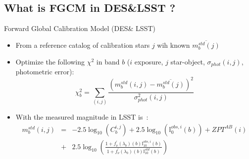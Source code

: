 \documentclass{beamer}
\begin{document}
\subsection{What is FGCM  in DES\&LSST ?}
\begin{frame}{Forward Global Calibration Model {\small (DES\& LSST)}}
\begin{itemize}
\item From a reference catalog of calibration stars $j$ wih known $\overline{m_b^{std}(j)}$
\item Optimize the following $\chi^2$ in band $b$ ($i$ exposure, $j$ star-object, $\sigma_{phot}(i,j)$, photometric error):
\begin{equation} 
\chi^2_b = 
\sum_{(i,j)} \frac{ \left(m_b^{std}(i,j) - \overline{m_b^{std}(j)} \right)^2}{\sigma_{phot}^2(i,j)}
\end{equation}
\item With the measured magnitude in LSST is~:
\begin{eqnarray}
m_b^{std}(i,j) & = & -2.5\log_{10}(C_b^{i,j}) +2.5\log_{10}(\mathbb{I}_0^{obs,i}(b)) +ZPT^{AB}(i)  \nonumber \\
& + & 2.5 \log_{10}\left( \frac{1+f_\nu^{\prime}(\lambda_b)(b)\mathbb{I}_{10}^{obs,i}(b)}{1+f_\nu^{\prime}(\lambda_b)(b)\mathbb{I}_{10}^{std}(b)}\right)
\end{eqnarray}
\end{itemize}
\end{frame}


\end{document}
